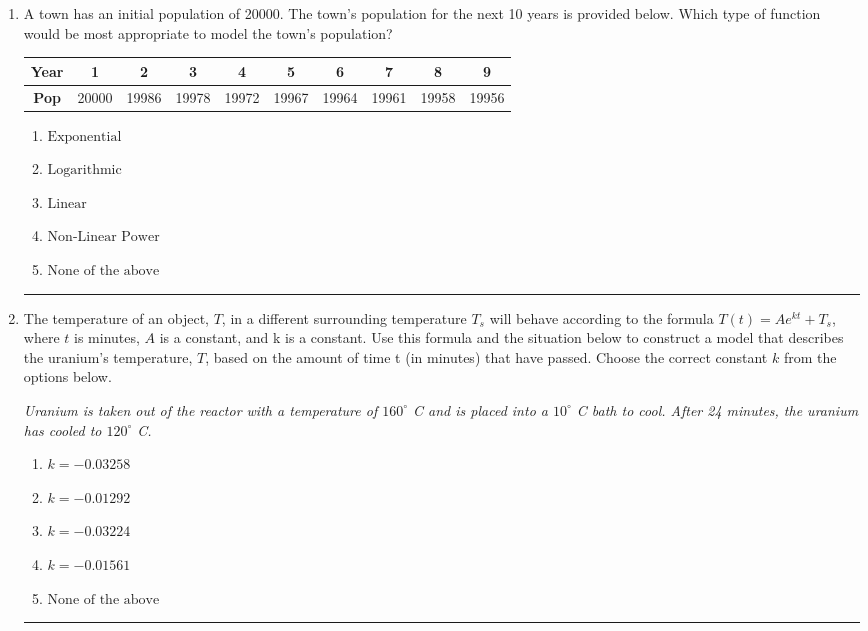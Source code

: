 \documentclass[14pt]{extbook}
\newcommand{\litem}[1]{\item#1\hspace*{-1cm}\rule{\textwidth}{0.4pt}}
\begin{document}
\begin{enumerate}
{\begin{enumerate}[label=\Alph*.]
\end{enumerate} }
\litem{
A town has an initial population of 20000. The town's population for the next 10 years is provided below. Which type of function would be most appropriate to model the town's population?

\begin{tabular}{c|c|c|c|c|c|c|c|c|c}
\textbf{Year} &1 &2 &3 &4 &5 &6 &7 &8 &9\tabularnewline \hline
\textbf{Pop} &20000 &19986 &19978 &19972 &19967 &19964 &19961 &19958 &19956\end{tabular}\begin{enumerate}[label=\Alph*.]
\item \( \text{Exponential} \)
\item \( \text{Logarithmic} \)
\item \( \text{Linear} \)
\item \( \text{Non-Linear Power} \)
\item \( \text{None of the above} \)

\end{enumerate} }
\litem{
The temperature of an object, $T$, in a different surrounding temperature $T_s$ will behave according to the formula $T(t) = Ae^{kt} + T_s$, where $t$ is minutes, $A$ is a constant, and k is a constant. Use this formula and the situation below to construct a model that describes the uranium's temperature, $T$, based on the amount of time t (in minutes) that have passed. Choose the correct constant $k$ from the options below.
\begin{center}
    \textit{ Uranium is taken out of the reactor with a temperature of $160^{\circ}$ C and is placed into a $10^{\circ}$ C bath to cool. After 24 minutes, the uranium has cooled to $120^{\circ}$ C. }
\end{center}
\begin{enumerate}[label=\Alph*.]
\item \( k = -0.03258 \)
\item \( k = -0.01292 \)
\item \( k = -0.03224 \)
\item \( k = -0.01561 \)
\item \( \text{None of the above} \)


\end{enumerate}}
\end{enumerate}
\end{document}

